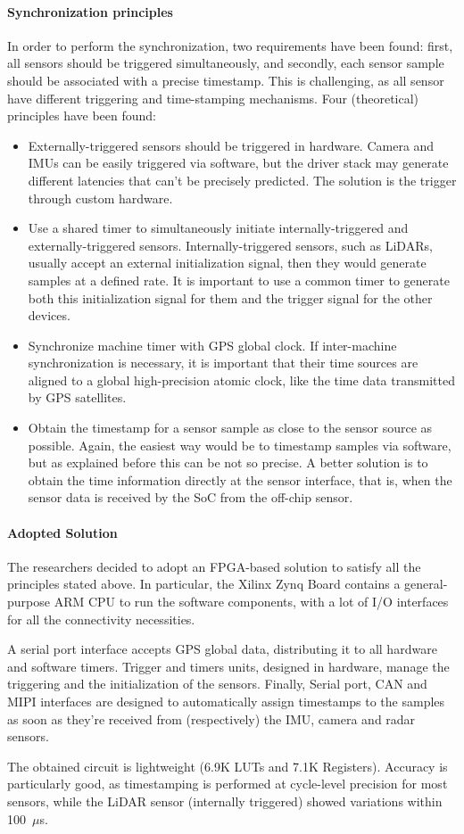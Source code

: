 \paragraph{Synchronization principles} In order to perform the synchronization, two requirements have been found: first, all sensors should be triggered simultaneously, and secondly, each sensor sample should be associated with a precise timestamp. This is challenging, as all sensor have different triggering and time-stamping mechanisms. 
Four (theoretical) principles have been found:
\begin{itemize}
    \item Externally-triggered sensors should be triggered in hardware. Camera and IMUs can be easily triggered via software, but the driver stack may generate different latencies that can't be precisely predicted. The solution is the trigger through custom hardware.
    \item Use a shared timer to simultaneously initiate internally-triggered and externally-triggered sensors. Internally-triggered sensors, such as LiDARs, usually accept an external initialization signal, then they would generate samples at a defined rate. It is important to use a common timer to generate both this initialization signal for them and the trigger signal for the other devices.  
    \item Synchronize machine timer with GPS global clock. If inter-machine synchronization is necessary, it is important that their time sources are aligned to a global high-precision atomic clock, like the time data transmitted by GPS satellites.
    \item Obtain the timestamp for a sensor sample as close to the sensor source as possible. Again, the easiest way would be to timestamp samples via software, but as explained before this can be not so precise. A better solution is to obtain the time information directly at the sensor interface, that is, when the sensor data is received by the SoC from the off-chip sensor. 
\end{itemize}

\paragraph{Adopted Solution} The researchers decided to adopt an FPGA-based solution to satisfy all the principles stated above. In particular, the Xilinx Zynq Board contains a general-purpose ARM CPU to run the software components, with a lot of I/O interfaces for all the connectivity necessities.

A serial port interface accepts GPS global data, distributing it to all hardware and software timers. Trigger and timers units, designed in hardware, manage the triggering and the initialization of the sensors. Finally, Serial port, CAN and MIPI interfaces are designed to automatically assign timestamps to the samples as soon as they're received from (respectively) the IMU, camera and radar sensors. 

The obtained circuit is lightweight (6.9K LUTs and 7.1K Registers). Accuracy is particularly good, as timestamping is performed at cycle-level precision for most sensors, while the LiDAR sensor (internally triggered) showed variations within 100~\(\mu\)s.
